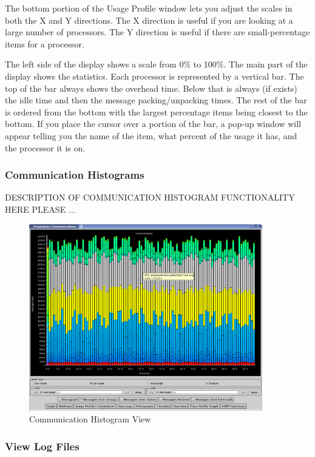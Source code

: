 \documentclass[10pt]{article}
\begin{document}
The bottom portion of the Usage Profile window lets you adjust the
scales in both the X and Y directions.  The X direction is useful if
you are looking at a large number of processors.  The Y direction is
useful if there are small-percentage items for a processor.

The left side of the display shows a scale from 0\% to 100\%.  The
main part of the display shows the statistics.  Each processor is
represented by a vertical bar.  The top of the bar always shows the
overhead time.  Below that is always (if exists) the idle time and
then the message packing/unpacking times.  The rest of the bar is
ordered from the bottom with the largest percentage items being
closest to the bottom.  If you place the cursor over a portion of the
bar, a pop-up window will appear telling you the name of the item,
what percent of the usage it has, and the processor it is on.

\subsubsection{Communication Histograms}

DESCRIPTION OF COMMUNICATION HISTOGRAM FUNCTIONALITY HERE PLEASE ...

\begin{figure}[htb]
\center
\includegraphics[width=4.0in]{fig/commhistogram}
\caption{Communication Histogram View}
\label{communication histogram}
\end{figure}

\subsubsection{View Log Files}
\end{document}
